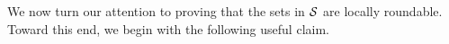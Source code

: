 %
%

\medskip \noindent We now turn our attention to proving that the sets in ${\cal S}$ are locally roundable. 
 Toward this end, we begin with the following useful claim.

